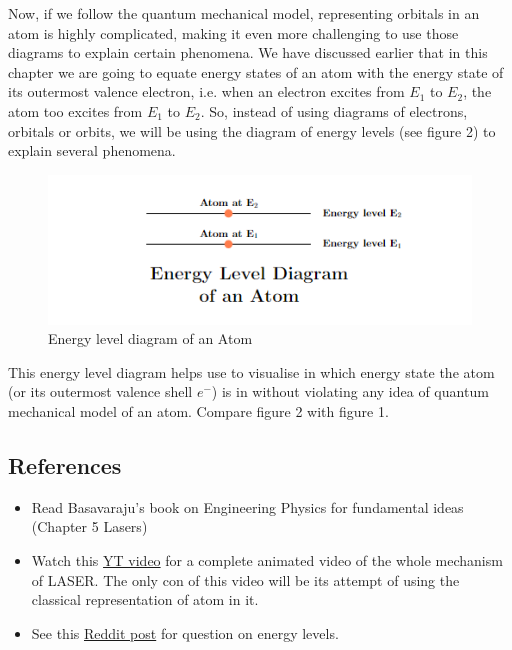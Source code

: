 \documentclass[12pt]{article}
\begin{document}
Now, if we follow the quantum mechanical model, representing orbitals in an atom is highly complicated, making it even more challenging to use those diagrams to explain certain phenomena. We have discussed earlier that in this chapter we are going to equate energy states of an atom with the energy state of its outermost valence electron, i.e. when an electron excites from $E_{1}$ to $E_{2}$, the atom too excites from $E_{1}$ to $E_{2}$. So, instead of using diagrams of electrons, orbitals or orbits, we will be using the diagram of energy levels (see figure 2) to explain several phenomena.

\begin{figure}[H]
    \centering
    \includegraphics[scale=0.8]{./img/02_energy_levels.png}
    \caption{Energy level diagram of an Atom}
\end{figure}

This energy level diagram helps use to visualise in which energy state the atom (or its outermost valence shell $e^{-}$) is in without violating any idea of quantum mechanical model of an atom. Compare figure 2 with figure 1.

\subsection{References}

\begin{itemize}
    \item Read Basavaraju's book on Engineering Physics for fundamental ideas (Chapter 5 Lasers)
    \item Watch this \href{https://www.youtube.com/watch?v=_JOchLyNO_w&t=233s}{YT video} for a complete animated video of the whole mechanism of LASER. The only con of this video will be its attempt of using the classical representation of atom in it.
    \item See this \href{https://www.reddit.com/r/Physics/comments/1ev7gss/are_energy_levels_for_electrons_or_atoms/}{Reddit post} for question on energy levels.
\end{itemize}
\end{document}
